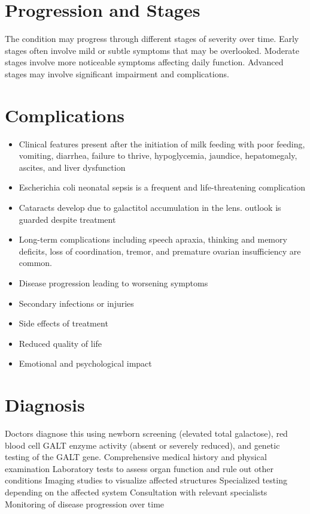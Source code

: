 \section{Progression and Stages}
The condition may progress through different stages of severity over time. Early stages often involve mild or subtle symptoms that may be overlooked. Moderate stages involve more noticeable symptoms affecting daily function. Advanced stages may involve significant impairment and complications.
\section{Complications}
\begin{itemize}[noitemsep]
  \item Clinical features present after the initiation of milk feeding with poor feeding, vomiting, diarrhea, failure to thrive, hypoglycemia, jaundice, hepatomegaly, ascites, and liver dysfunction
  \item Escherichia coli neonatal sepsis is a frequent and life-threatening complication
  \item Cataracts develop due to galactitol accumulation in the lens. outlook is guarded despite treatment
  \item Long-term complications including speech apraxia, thinking and memory deficits, loss of coordination, tremor, and premature ovarian insufficiency are common.
  \item Disease progression leading to worsening symptoms
  \item Secondary infections or injuries
  \item Side effects of treatment
  \item Reduced quality of life
  \item Emotional and psychological impact
\end{itemize}
\section{Diagnosis}
Doctors diagnose this using newborn screening (elevated total galactose), red blood cell GALT enzyme activity (absent or severely reduced), and genetic testing of the GALT gene. Comprehensive medical history and physical examination Laboratory tests to assess organ function and rule out other conditions Imaging studies to visualize affected structures Specialized testing depending on the affected system Consultation with relevant specialists Monitoring of disease progression over time


